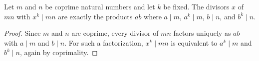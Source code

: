 \begin{theorem}
\label{pow_divisors_mul}
\leanok
Let $m$ and $n$ be coprime natural numbers and let $k$ be fixed. The divisors $x$ of $mn$ with
    $x^k \mid mn$ are exactly the products $ab$ where $a \mid m$, $a^k \mid m$, $b \mid n$, and
    $b^k \mid n$.
\end{theorem}
\begin{proof}
\leanok
Since $m$ and $n$ are coprime, every divisor of $mn$ factors uniquely as $ab$ with $a \mid m$
    and $b \mid n$. For such a factorization, $x^k \mid mn$ is equivalent to $a^k \mid m$ and
    $b^k \mid n$, again by coprimality.
\end{proof}
